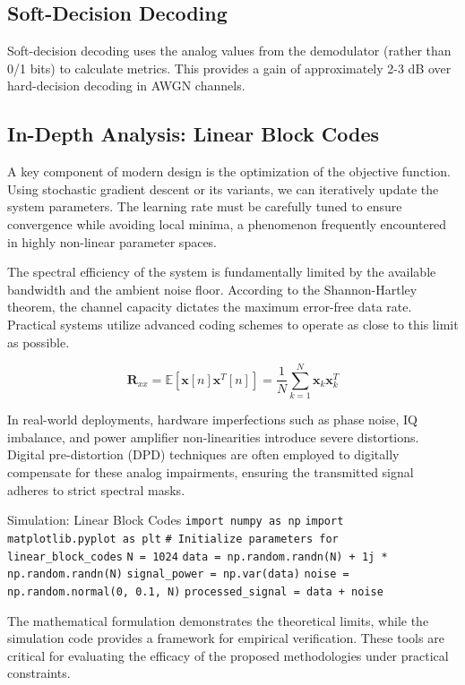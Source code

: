 \subsection{Soft-Decision Decoding}
Soft-decision decoding uses the analog values from the demodulator (rather than 0/1 bits) to calculate metrics. This provides a gain of approximately 2-3 dB over hard-decision decoding in AWGN channels.

\subsection{In-Depth Analysis: Linear Block Codes}
A key component of modern design is the optimization of the objective function. Using stochastic gradient descent or its variants, we can iteratively update the system parameters. The learning rate must be carefully tuned to ensure convergence while avoiding local minima, a phenomenon frequently encountered in highly non-linear parameter spaces.

The spectral efficiency of the system is fundamentally limited by the available bandwidth and the ambient noise floor. According to the Shannon-Hartley theorem, the channel capacity dictates the maximum error-free data rate. Practical systems utilize advanced coding schemes to operate as close to this limit as possible.

\begin{equation}
    \mathbf{R}_{xx} = \mathbb{E}[\mathbf{x}[n]\mathbf{x}^T[n]] = \frac{1}{N} \sum_{k=1}^{N} \mathbf{x}_k \mathbf{x}_k^T
\end{equation}

In real-world deployments, hardware imperfections such as phase noise, IQ imbalance, and power amplifier non-linearities introduce severe distortions. Digital pre-distortion (DPD) techniques are often employed to digitally compensate for these analog impairments, ensuring the transmitted signal adheres to strict spectral masks.

\begin{pythonbox}{Simulation: Linear Block Codes}
\texttt{import numpy as np}
\texttt{import matplotlib.pyplot as plt}
\texttt{}
\texttt{\# Initialize parameters for linear\_block\_codes}
\texttt{N = 1024}
\texttt{data = np.random.randn(N) + 1j * np.random.randn(N)}
\texttt{signal\_power = np.var(data)}
\texttt{noise = np.random.normal(0, 0.1, N)}
\texttt{processed\_signal = data + noise}
\end{pythonbox}

\vspace{0.5cm}
The mathematical formulation demonstrates the theoretical limits, while the simulation code provides a framework for empirical verification. These tools are critical for evaluating the efficacy of the proposed methodologies under practical constraints.


